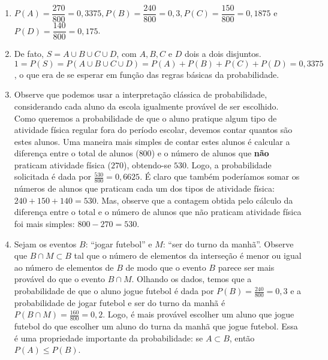 \documentclass[10 pt,usenames,dvipsnames, oneside]{article}
\begin{document}
\ifdefined\prof
\begin{solucao}

\begin{enumerate}
\item $P(A)=\dfrac{270}{800}=0{,}3375, P(B)=\dfrac{240}{800}=0{,}3, P(C)=\dfrac{150}{800}=0{,}1875$ e $P(D)=\dfrac{140}{800}=0{,}175$.

\item De fato, $S=A\cup B\cup C\cup D$, com $A, B, C $ e $D$ dois a dois disjuntos. $1=P(S)=P(A\cup B\cup C \cup D)=P(A)+P(B)+P(C)+P(D)=0{,}3375$, o que era de se esperar em função das regras básicas da probabilidade.

\item Observe que podemos usar a interpretação clássica de probabilidade, considerando cada aluno da escola igualmente provável de ser escolhido. Como queremos a probabilidade de que o aluno pratique algum tipo de atividade física regular fora do período escolar, devemos contar quantos são estes alunos. Uma maneira mais simples de contar estes alunos é calcular a diferença entre o total de alunos ($800$) e o número de alunos que \textbf{não} praticam atividade física ($270$), obtendo-se $530$. Logo, a probabilidade solicitada é dada por $\frac{530}{800}=0{,}6625$. É claro que também poderíamos somar os números de alunos que praticam cada um dos tipos de atividade física: $240+150+140=530$. Mas, observe que a contagem obtida pelo cálculo da diferença entre o total e o número de alunos que não praticam atividade física foi mais simples: $800−270=530$.

\item  Sejam os eventos $B$: “jogar futebol”{} e $M$: “ser do turno da manhã”. Observe que $B\cap M\subset B$ tal que o número de elementos da interseção é menor ou igual ao número de elementos de $B$ de modo que o evento $B$ parece ser mais provável do que o evento $B\cap M$. Olhando os dados, temos que a probabilidade de que o aluno jogue futebol é dada por $P(B)=\frac{240}{800}=0{,}3$ e a probabilidade de jogar futebol e ser do turno da manhã é $P(B\cap M)=\frac{160}{800}=0{,}2$. Logo, é mais provável escolher um aluno que jogue futebol do que escolher um aluno do turna da manhã que jogue futebol. Essa é uma propriedade importante da probabilidade: se $A\subset B$, então $P(A)\leq P(B)$.


\end{enumerate}
\end{solucao}
\end{document}
